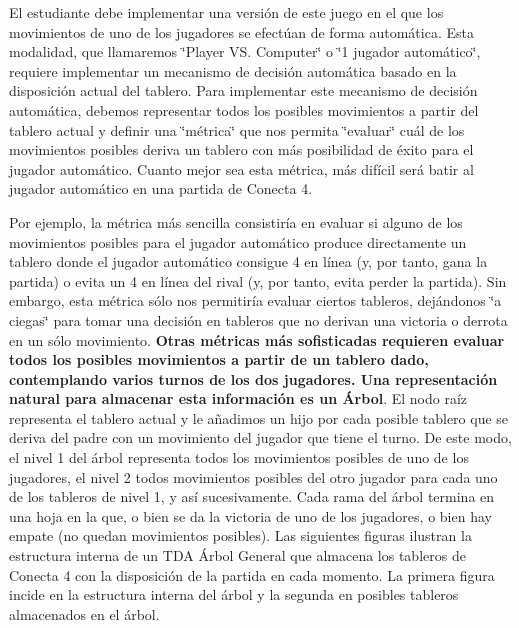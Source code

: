 El estudiante debe implementar una versión de este juego en el que los movimientos de uno de los jugadores se efectúan de forma automática. Esta modalidad, que llamaremos \char`\"{}\-Player V\-S. Computer\char`\"{} o \char`\"{}1 jugador automático\char`\"{}, requiere implementar un mecanismo de decisión automática basado en la disposición actual del tablero. Para implementar este mecanismo de decisión automática, debemos representar todos los posibles movimientos a partir del tablero actual y definir una \char`\"{}métrica\char`\"{} que nos permita \char`\"{}evaluar\char`\"{} cuál de los movimientos posibles deriva un tablero con más posibilidad de éxito para el jugador automático. Cuanto mejor sea esta métrica, más difícil será batir al jugador automático en una partida de Conecta 4.

Por ejemplo, la métrica más sencilla consistiría en evaluar si alguno de los movimientos posibles para el jugador automático produce directamente un tablero donde el jugador automático consigue 4 en línea (y, por tanto, gana la partida) o evita un 4 en línea del rival (y, por tanto, evita perder la partida). Sin embargo, esta métrica sólo nos permitiría evaluar ciertos tableros, dejándonos \char`\"{}a ciegas\char`\"{} para tomar una decisión en tableros que no derivan una victoria o derrota en un sólo movimiento. {\bfseries Otras métricas más sofisticadas requieren evaluar todos los posibles movimientos a partir de un tablero dado, contemplando varios turnos de los dos jugadores. Una representación natural para almacenar esta información es un Árbol}. El nodo raíz representa el tablero actual y le añadimos un hijo por cada posible tablero que se deriva del padre con un movimiento del jugador que tiene el turno. De este modo, el nivel 1 del árbol representa todos los movimientos posibles de uno de los jugadores, el nivel 2 todos movimientos posibles del otro jugador para cada uno de los tableros de nivel 1, y así sucesivamente. Cada rama del árbol termina en una hoja en la que, o bien se da la victoria de uno de los jugadores, o bien hay empate (no quedan movimientos posibles). Las siguientes figuras ilustran la estructura interna de un T\-D\-A Árbol General que almacena los tableros de Conecta 4 con la disposición de la partida en cada momento. La primera figura incide en la estructura interna del árbol y la segunda en posibles tableros almacenados en el árbol.


